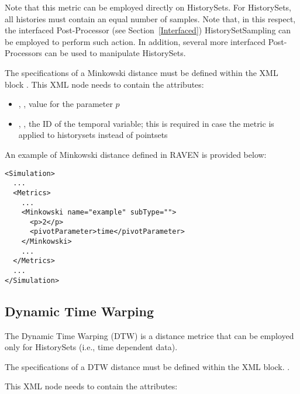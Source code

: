 Note that this metric can be employed directly on HistorySets.
For HistorySets, all histories must contain an equal number of samples. Note that, in this respect, the interfaced Post-Processor (see Section~\ref{Interfaced}) 
HistorySetSampling can be employed to perform such action. In addition, several more interfaced Post-Processors can be used to manipulate HistorySets.

The specifications of a Minkowski distance must be defined within the XML block
.
%
This XML node needs to contain the attributes:

\begin{itemize}
  \item {}, , value for the parameter $p$
  \item {}, , the ID of the temporal variable; this is required in case the metric is applied to historysets instead of pointsets
\end{itemize}

An example of Minkowski distance defined in RAVEN is provided below:
\begin{lstlisting}[style=XML]
<Simulation> 
  ...
  <Metrics>
    ...
    <Minkowski name="example" subType="">
      <p>2</p>
      <pivotParameter>time</pivotParameter>
    </Minkowski>
    ...
  </Metrics>
  ...
</Simulation>
\end{lstlisting}


\subsection{Dynamic Time Warping}
\label{subsection:DTW}
The Dynamic Time Warping (DTW) is a distance metrice that can be employed only for HistorySets (i.e., time dependent data).

The specifications of a DTW distance must be defined within the XML block.
.

This XML node needs to contain the attributes:


